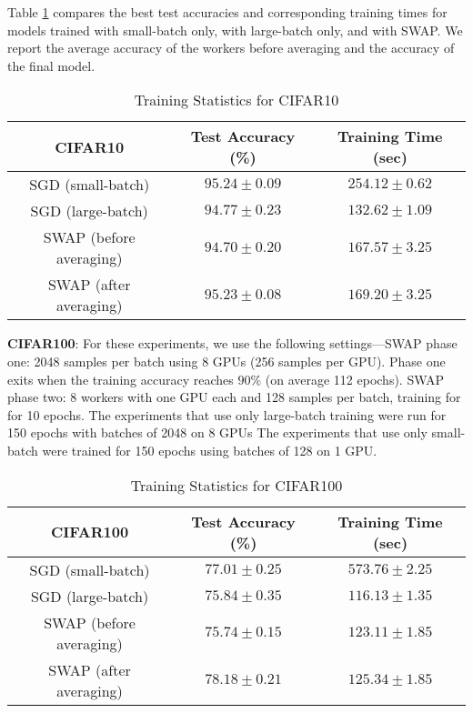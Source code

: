 \documentclass{article} %
\begin{document}
Table \ref{table:cifar10} compares the best test accuracies and corresponding
training times for models trained with small-batch only, with large-batch only,
and with SWAP. We report the average accuracy of the workers before averaging
and the accuracy of the final model. 

\begin{table}[h] \centering \begin{tabular}{ccc} \multicolumn{1}{c}{\bf
		CIFAR10}  &\multicolumn{1}{c}{\bf Test Accuracy (\%)} &
		\multicolumn{1}{c}{\bf Training Time (sec)}\\
 \hline SGD (small-batch) & $95.24 \pm 0.09$ & $254.12 \pm 0.62$ \\ SGD
 (large-batch) & $94.77 \pm 0.23$ & $132.62 \pm 1.09$ \\ SWAP (before
 averaging) & $94.70 \pm 0.20$ & $167.57 \pm 3.25$ \\ SWAP (after averaging) &
 $95.23 \pm 0.08$ & $169.20 \pm 3.25$ \\ \hline \end{tabular} \caption{Training
 Statistics for CIFAR10} \label{table:cifar10} 
\vspace{-0.1in}
 \end{table}

\textbf{CIFAR100}: For these experiments, we use the following settings---SWAP
phase one: 2048 samples per batch using 8 GPUs (256 samples per GPU). Phase one
exits when the training accuracy reaches $90\%$ (on average 112 epochs).  SWAP
phase two: 8 workers with one GPU each and 128 samples per batch, training for for
10 epochs. The experiments that use only large-batch training were run for 150
epochs with batches of 2048 on 8 GPUs 
The experiments that use only small-batch were trained for 150 epochs using batches of 128 on 1 GPU.

\begin{table}[h] \centering \begin{tabular}{ccc} \multicolumn{1}{c}{\bf
		CIFAR100}  &\multicolumn{1}{c}{\bf Test Accuracy (\%)} &
		\multicolumn{1}{c}{\bf Training Time (sec)}\\ \hline SGD
		(small-batch) & $77.01 \pm 0.25$ & $573.76 \pm 2.25$ \\ SGD
		(large-batch) & $75.84 \pm 0.35$ & $116.13 \pm 1.35$ \\ SWAP
		(before averaging) & $75.74 \pm 0.15$ & $123.11 \pm 1.85$ \\
		SWAP (after averaging) & $78.18 \pm 0.21$ & $125.34 \pm 1.85$
		\\ \hline \end{tabular} \caption{Training Statistics for
	CIFAR100} \label{table:cifar100} 
\vspace{-0.1in}
	\end{table}
\end{document}
